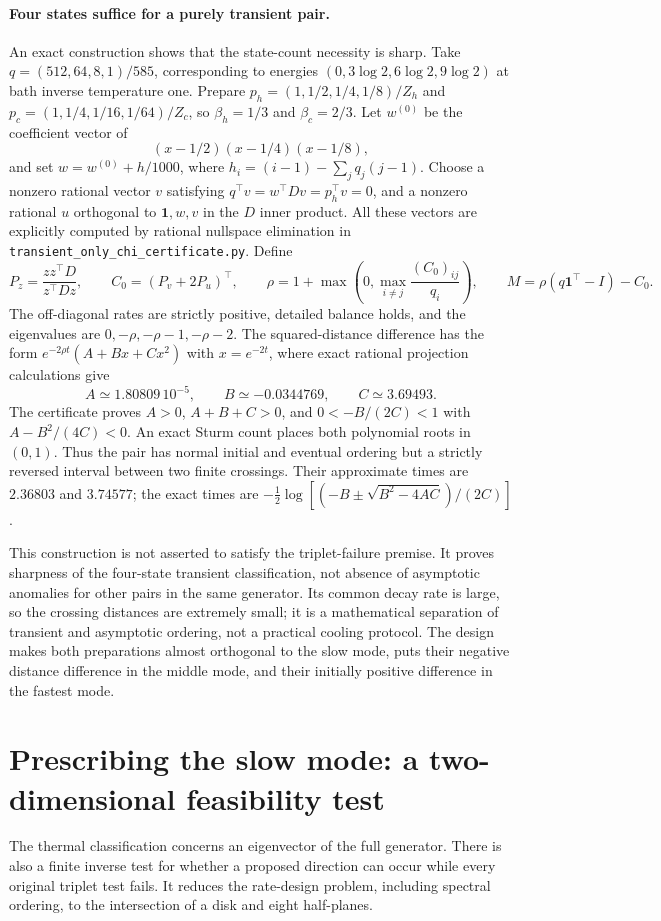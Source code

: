\documentclass[11pt]{article}
\begin{document}
\paragraph{Four states suffice for a purely transient pair.}
An exact construction shows that the state-count necessity is sharp.
Take $q=(512,64,8,1)/585$, corresponding to energies
$(0,3\log2,6\log2,9\log2)$ at bath inverse temperature one. Prepare
$p_h=(1,1/2,1/4,1/8)/Z_h$ and
$p_c=(1,1/4,1/16,1/64)/Z_c$, so $\beta_h=1/3$ and $\beta_c=2/3$.
Let $w^{(0)}$ be the coefficient vector of
\[
(x-1/2)(x-1/4)(x-1/8),
\]
and set $w=w^{(0)}+h/1000$, where
$h_i=(i-1)-\sum_jq_j(j-1)$. Choose a nonzero rational vector $v$ satisfying
$q^\top v=w^\top Dv=p_h^\top v=0$, and a nonzero rational $u$ orthogonal
to $\mathbf1,w,v$ in the $D$ inner product. All these vectors are explicitly
computed by rational nullspace elimination in
\texttt{transient\_only\_chi\_certificate.py}. Define
\[
P_z=\frac{zz^\top D}{z^\top Dz},\qquad
C_0=(P_v+2P_u)^\top,\qquad
\rho=1+\max\left(0,\max_{i\ne j}\frac{(C_0)_{ij}}{q_i}\right),
\qquad M=\rho(q\mathbf1^\top-I)-C_0.
\]
The off-diagonal rates are strictly positive, detailed balance holds, and
the eigenvalues are $0,-\rho,-\rho-1,-\rho-2$. The squared-distance
difference has the form $e^{-2\rho t}(A+Bx+Cx^2)$ with $x=e^{-2t}$,
where exact rational projection calculations give
\[
A\simeq1.80809\,10^{-5},\qquad B\simeq-0.0344769,\qquad C\simeq3.69493.
\]
The certificate proves $A>0$, $A+B+C>0$, and
$0<-B/(2C)<1$ with $A-B^2/(4C)<0$. An exact Sturm count places both
polynomial roots in $(0,1)$. Thus the pair has normal initial and eventual
ordering but a strictly reversed interval between two finite crossings.
Their approximate times are $2.36803$ and $3.74577$; the exact times are
$-\tfrac12\log[(-B\pm\sqrt{B^2-4AC})/(2C)]$.

This construction is not asserted to satisfy the triplet-failure premise.
It proves sharpness of the four-state transient classification, not absence
of asymptotic anomalies for other pairs in the same generator. Its common
decay rate is large, so the crossing distances are extremely small; it is
a mathematical separation of transient and asymptotic ordering, not a
practical cooling protocol. The design makes both preparations almost
orthogonal to the slow mode, puts their negative distance difference in the
middle mode, and their initially positive difference in the fastest mode.

\section{Prescribing the slow mode: a two-dimensional feasibility test}\label{sec:realizability}
The thermal classification concerns an eigenvector of the full generator.
There is also a finite inverse test for whether a proposed direction can occur
while every original triplet test fails. It reduces the rate-design problem,
including spectral ordering, to the intersection of a disk and eight half-planes.
\end{document}
